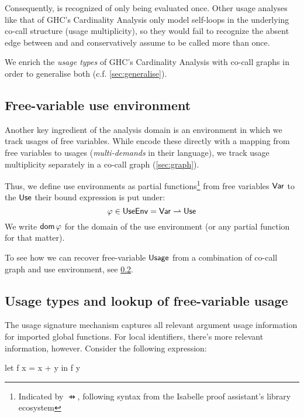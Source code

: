 Consequently,  is recognized of only being evaluated once. 
Other usage analyses like that of GHC's Cardinality Analysis \parencite{card} only model self-loops in the underlying co-call structure (\eg usage multiplicity), so they would fail to recognize the absent edge between  and  and conservatively assume  to be called more than once.


We enrich the \emph{usage types} of GHC's Cardinality Analysis \parencite{card} with co-call graphs in order to generalise both (c.f. \cref{sec:generalise}).

\subsection{Free-variable use environment}\label{sec:useenv}

Another key ingredient of the analysis domain is an environment in which we track usages of free variables.
While \textcite{card} encode these directly with a mapping from free variables to usages (\emph{multi-demands} in their language), we track usage multiplicity separately in a co-call graph (\cref{sec:graph}).

Thus, we define use environments as partial functions\footnote{Indicated by $\pfun$, following syntax from the Isabelle proof assistant's library ecosystem} from free variables $\text{\textsf{Var}}$ to the $\text{\textsf{Use}}$ their bound expression is put under:
\[
\varphi \in \text{\textsf{UseEnv}} = \text{\textsf{Var}} \rightharpoonup \text{\textsf{Use}}
\]
We write $\mathsf{dom}\,\varphi$ for the domain of the use environment (or any partial function for that matter).

To see how we can recover free-variable $\text{\textsf{Usage}}$ from a combination of co-call graph and use environment, see \cref{sec:utype}.

\subsection{Usage types and lookup of free-variable usage}\label{sec:utype}

The usage signature mechanism captures all relevant argument usage information for imported global functions.
For local identifiers, there's more relevant information, however.
Consider the following expression:

\begin{haskellcode}
let f x = x + y
in f y
\end{haskellcode}

